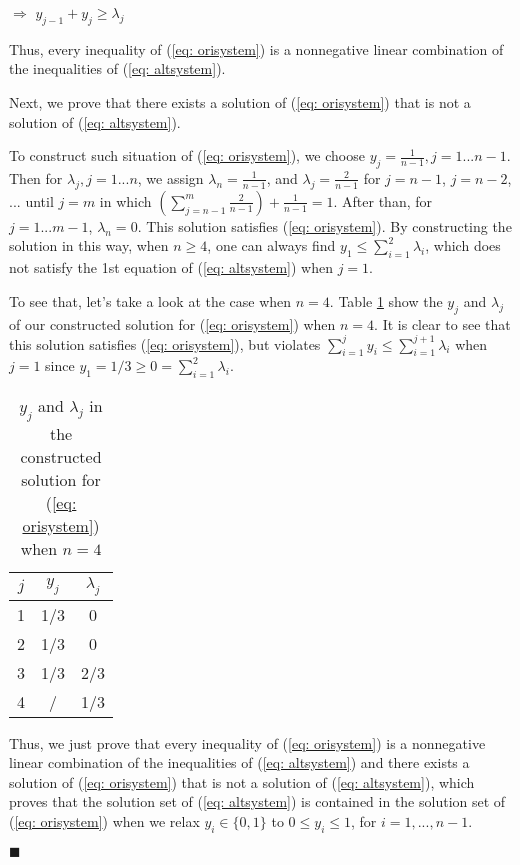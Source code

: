 $\Rightarrow$ $y_{j-1}+y_j\geq{}\lambda_j$

Thus, every inequality of (\ref{eq: orisystem}) is a nonnegative linear combination of the inequalities of (\ref{eq: altsystem}).

Next, we prove that there exists a solution of (\ref{eq: orisystem}) that is not a solution of (\ref{eq: altsystem}).

To construct such situation of (\ref{eq: orisystem}), we choose $y_j=\frac{1}{n-1}, j=1...n-1$. Then for $\lambda_j, j=1...n$, we assign $\lambda_n=\frac{1}{n-1}$, and $\lambda_j=\frac{2}{n-1}$ for $j=n-1$, $j=n-2$,$...$ until $j=m$ in which $(\sum_{j=n-1}^{m} \frac{2}{n-1}) + \frac{1}{n-1}=1$. After than, for $j=1...m-1$,  $\lambda_n=0$. This solution satisfies (\ref{eq: orisystem}). By constructing the solution in this way, when $n\geq4$, one can always find $y_1\leq{}\sum_{i=1}^{2}\lambda_i$, which does not satisfy the 1st equation of (\ref{eq: altsystem}) when $j=1$.

To see that, let's take a look at the case when $n=4$. Table \ref{tab: p5_res} show the $y_j$ and $\lambda_j$ of our constructed solution for (\ref{eq: orisystem}) when $n=4$. It is clear to see that this solution satisfies (\ref{eq: orisystem}), but violates $\sum_{i=1}^{j} y_i\leq{}\sum_{i=1}^{j+1} \lambda_i$ when $j=1$ since $y_1=1/3\geq{}0=\sum_{i=1}^{2}\lambda_i$.

\begin{table}[!ht]
\centering
\begin{tabular}{|c|c|c|}
\hline
$j$ & $y_j$ & $\lambda_j$ \\
\hline
1  & 1/3 & 0\\
\hline
2  & 1/3 & 0\\
\hline
3  & 1/3 & 2/3\\
\hline
4  & / & 1/3\\
\hline
\end{tabular}
\caption{$y_j$ and $\lambda_j$ in the constructed solution for (\ref{eq: orisystem}) when $n=4$}
\label{tab: p5_res}
\end{table}

Thus, we just prove that every inequality of (\ref{eq: orisystem}) is a nonnegative linear combination of the inequalities of (\ref{eq: altsystem}) and there exists a solution of (\ref{eq: orisystem}) that is not a solution of (\ref{eq: altsystem}), which proves that  the solution set of (\ref{eq: altsystem}) is contained in the solution set of (\ref{eq: orisystem}) when we relax $y_i\in\lbrace0,1\rbrace$ to $0\leq{}y_i\leq1$, for $i=1,...,n−1$. 
\begin{flushright} $\blacksquare$ \end{flushright}